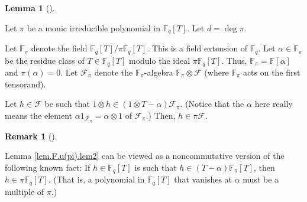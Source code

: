 \documentclass[numbers=enddot,12pt,final,onecolumn,notitlepage]{scrartcl}%
\theoremstyle{definition}
\newtheorem{lem}[theo]{Lemma}
\newenvironment{lemma}[1][]
{\begin{lem}[#1]\begin{leftbar}}
{\end{leftbar}\end{lem}}
\newtheorem{remk}[theo]{Remark}
\newenvironment{remark}[1][]
{\begin{remk}[#1]\begin{leftbar}}
{\end{leftbar}\end{remk}}
\begin{document}
\begin{lemma}
\label{lem.F.u(pi).lem2}Let $\pi$ be a monic irreducible polynomial in
$\mathbb{F}_{q}\left[  T\right]  $. Let $d=\deg\pi$.

Let $\mathbb{F}_{\pi}$ denote the field $\mathbb{F}_{q}\left[  T\right]
/\pi\mathbb{F}_{q}\left[  T\right]  $. This is a field extension of
$\mathbb{F}_{q}$. Let $\alpha\in\mathbb{F}_{\pi}$ be the residue class of
$T\in\mathbb{F}_{q}\left[  T\right]  $ modulo the ideal $\pi\mathbb{F}%
_{q}\left[  T\right]  $. Thus, $\mathbb{F}_{\pi}=\mathbb{F}\left[
\alpha\right]  $ and $\pi\left(  \alpha\right)  =0$. Let $\mathcal{F}_{\pi}$
denote the $\mathbb{F}_{\pi}$-algebra $\mathbb{F}_{\pi}\otimes\mathcal{F}$
(where $\mathbb{F}_{\pi}$ acts on the first tensorand).

Let $h\in\mathcal{F}$ be such that $1\otimes h\in\left(  1\otimes
T-\alpha\right)  \mathcal{F}_{\pi}$. (Notice that the $\alpha$ here really
means the element $\alpha1_{\mathcal{F}_{\pi}}=\alpha\otimes1$ of
$\mathcal{F}_{\pi}$.) Then, $h\in\pi\mathcal{F}$.
\end{lemma}

\begin{remark}
\label{rmk.lem.F.u(pi).lem2.exp}Lemma \ref{lem.F.u(pi).lem2} can be viewed as
a noncommutative version of the following known fact: If $h\in\mathbb{F}%
_{q}\left[  T\right]  $ is such that $h\in\left(  T-\alpha\right)
\mathbb{F}_{\pi}\left[  T\right]  $, then $h\in\pi\mathbb{F}_{q}\left[
T\right]  $. (That is, a polynomial in $\mathbb{F}_{q}\left[  T\right]  $ that
vanishes at $\alpha$ must be a multiple of $\pi$.)
\end{remark}
\end{document}
